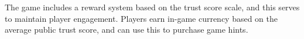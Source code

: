 The game includes a reward system based on the trust score scale, and this serves to maintain player engagement. Players earn in-game currency based on the average public trust score, and can use this to purchase game hints.

